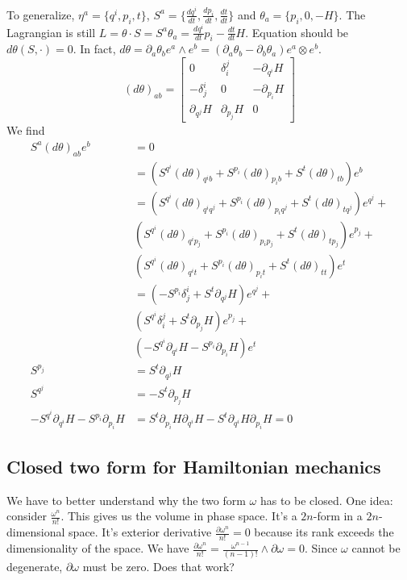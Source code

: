 \documentclass[11pt,letterpaper,fleqn]{memoir} %
\begin{document}
To generalize, $\eta^a=\{q^i,p_i,t\}$, $S^a=\{\frac{dq^i}{dt},\frac{dp_i}{dt},\frac{dt}{dt}\}$ and $\theta_a=\{p_i,0,-H\}$. The Lagrangian is still $L=\theta \cdot S = S^a \theta_a = \frac{dq^i}{dt}p_i - \frac{dt}{dt}H$. Equation should be $d\theta(S, \cdot ) = 0$. In fact, $d\theta = \partial_a \theta_b e^a \wedge e^b = (\partial_a \theta_b - \partial_b \theta_a) e^a \otimes e^b$.
\begin{equation*}
(d\theta)_{ab} = \begin{bmatrix}
0 & \delta^j_i & - \partial_{q^i} H \\
-\delta^i_j & 0 & - \partial_{p_i} H \\
\partial_{q^j} H & \partial_{p_j} H & 0
\end{bmatrix}
\end{equation*}
We find
\begin{align*}
S^a (d\theta)_{ab} e^b &= 0 \\
&= (S^{q^i}(d\theta)_{q^ib} + S^{p_i}(d\theta)_{p_ib} + S^{t}(d\theta)_{tb}) e^b \\
&= (S^{q^i}(d\theta)_{q^iq^j} + S^{p_i}(d\theta)_{p_iq^j} + S^{t}(d\theta)_{tq^j}) e^{q^j} + \\
& (S^{q^i}(d\theta)_{q^ip_j} +  S^{p_i}(d\theta)_{p_ip_j} + S^{t}(d\theta)_{tp_j}) e^{p_j} + \\
& (S^{q^i}(d\theta)_{q^it} + S^{p_i}(d\theta)_{p_it} + S^{t}(d\theta)_{tt}) e^t \\
&= (-S^{p_i}\delta^i_j + S^{t}\partial_{q^j} H ) e^{q^j} + \\
& (S^{q^i}\delta^j_i +  S^{t}\partial_{p_j} H) e^{p_j} + \\
& (-S^{q^i} \partial_{q^i} H - S^{p_i} \partial_{p_i} H) e^t \\
S^{p_j} &= S^{t} \partial_{q^j} H \\
S^{q^j} &= - S^{t}\partial_{p_j} H \\
-S^{q^i} \partial_{q^i} H - S^{p_i} \partial_{p_i} H &= S^{t}\partial_{p_i} H \partial_{q^i} H - S^{t} \partial_{q^i} H \partial_{p_i} H = 0
\end{align*}

\subsection{Closed two form for Hamiltonian mechanics}

We have to better understand why the two form $\omega$ has to be closed. One idea: consider $\frac{\omega^n}{n!}$. This gives us the volume in phase space. It's a $2n$-form in a $2n$-dimensional space. It's exterior derivative $\frac{\partial\omega^n}{n!}=0$ because its rank exceeds the dimensionality of the space. We have $\frac{\partial\omega^n}{n!}=\frac{\omega^{n-1}}{(n-1)!}\wedge\partial\omega=0$. Since $\omega$ cannot be degenerate, $\partial \omega$ must be zero. Does that work?
\end{document}
